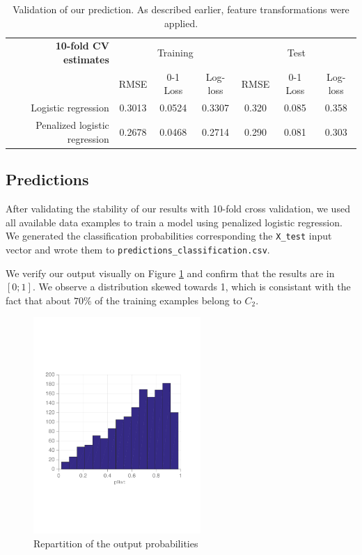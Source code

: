\documentclass{article} %
\begin{document}
  \begin{table}[ht]
    \center
    \begin{tabular}{|r|c|c|c|c|c|c|}
      \hline
      \textbf{10-fold CV estimates} & \multicolumn{3}{c|}{Training}   & \multicolumn{3}{c|}{Test}    \\
                                    & RMSE      & 0-1 Loss & Log-loss & RMSE   & 0-1 Loss & Log-loss \\
      \hline
      Logistic regression           & 0.3013    & 0.0524   & 0.3307   & 0.320  & 0.085    & 0.358    \\
      \hline
      Penalized logistic regression & 0.2678    & 0.0468   & 0.2714   & 0.290  & 0.081    & 0.303    \\
      \hline
    \end{tabular}
    \caption{Validation of our prediction. As described earlier, feature transformations were applied.}
    \label{classifier-validation}
  \end{table}

  \subsection{Predictions}
  After validating the stability of our results with 10-fold cross validation, we used all available data examples to train a model using penalized logistic regression. We generated the classification probabilities corresponding the \texttt{X\_test} input vector and wrote them to \texttt{predictions\_classification.csv}.

  We verify our output visually on Figure \ref{fig:classification-output} and confirm that the results are in $[0; 1]$. We observe a distribution skewed towards 1, which is consistant with the fact that about $70\%$ of the training examples belong to $C_2$.

  \begin{figure}[ht]
    \center
    \includegraphics[width=2.5in]{figures/classification/output-phat.pdf}
    \caption{Repartition of the output probabilities}
    \label{fig:classification-output}
  \end{figure}
\end{document}
